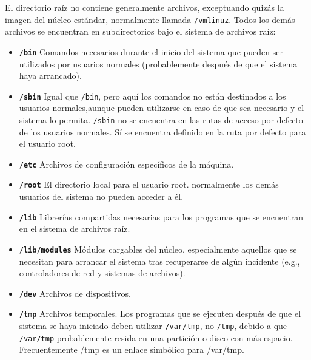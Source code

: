  El directorio raíz no contiene generalmente archivos, exceptuando quizás
la imagen del núcleo estándar, normalmente llamada
\texttt{/vmlinuz}.  Todos los demás archivos se encuentran en
subdirectorios bajo el sistema de archivos raíz:

\begin{itemize} 

	\item \textbf{\texttt{/bin}}
	 Comandos necesarios durante el inicio del sistema que
	pueden ser utilizados por usuarios normales (probablemente después de
	que el sistema haya arrancado).  

	\item \textbf{\texttt{/sbin}}
	 Igual que \texttt{/bin}, pero aquí los
	comandos 	no están destinados a los usuarios normales,aunque
	pueden utilizarse en caso de que sea necesario y el sistema lo permita.
	\texttt{/sbin} no se encuentra en las rutas de acceso por
	defecto de los usuarios normales. Sí se encuentra definido en la ruta
	por 		defecto para el usuario root.
	


	\item \textbf{\texttt{/etc}}
	 Archivos de configuración específicos de la máquina.
	

	
	\item \textbf{\texttt{/root}}
	 El directorio local para el usuario root.  normalmente
	los demás usuarios del sistema no pueden acceder a él.
	


	\item \textbf{\texttt{/lib}}
	 Librerías compartidas necesarias para los programas que
	se encuentran en el sistema de archivos raíz.
	


	\item \textbf{\texttt{/lib/modules}}
	 Módulos cargables del núcleo, especialmente
	aquellos que se necesitan para arrancar el sistema tras recuperarse
	de algún incidente (e.g., controladores de red y sistemas de
	archivos).


	\item \textbf{\texttt{/dev}}
	 Archivos de dispositivos.


	\item \textbf{\texttt{/tmp}}
	 Archivos temporales. Los programas que se ejecuten
	después de que el sistema se haya iniciado deben utilizar
	\texttt{/var/tmp}, no \texttt{/tmp},
	debido a que \texttt{/var/tmp} probablemente resida en una
	partición o disco con más espacio. Frecuentemente /tmp es un enlace
	simbólico para /var/tmp.  



\end{itemize}
